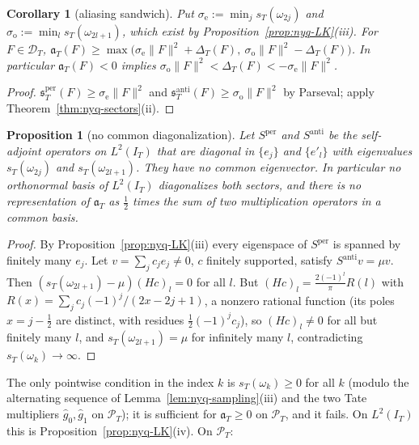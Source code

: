 \documentclass[11pt]{amsart}
\newtheorem{proposition}[theorem]{Proposition}
\newtheorem{corollary}[theorem]{Corollary}
\theoremstyle{definition}
\theoremstyle{remark}
\newcommand{\PT}{\mathcal P_T}
\newcommand{\IT}{I_T}
\newcommand{\gh}[1]{\widehat g_{#1}}
\begin{document}
\begin{corollary}[aliasing sandwich]\label{cor:nyq-sandwich}
Put $\sigma_{\mathrm e}:=\min_js_T(\omega_{2j})$ and $\sigma_{\mathrm o}:=\min_ls_T(\omega_{2l+1})$, which exist by
Proposition~\ref{prop:nyq-LK}(iii). For $F\in\mathcal D_T$,
$\mathfrak a_T(F)\ge\max\big(\sigma_{\mathrm e}\|F\|^2+\Delta_T(F),\ \sigma_{\mathrm o}\|F\|^2-\Delta_T(F)\big)$. In particular
$\mathfrak a_T(F)<0$ implies $\sigma_{\mathrm o}\|F\|^2<\Delta_T(F)<-\sigma_{\mathrm e}\|F\|^2$.
\end{corollary}

\begin{proof}
$\mathfrak s^{\mathrm{per}}_T(F)\ge\sigma_{\mathrm e}\|F\|^2$ and $\mathfrak s^{\mathrm{anti}}_T(F)\ge\sigma_{\mathrm o}\|F\|^2$ by Parseval;
apply Theorem~\ref{thm:nyq-sectors}(ii).
\end{proof}

\begin{proposition}[no common diagonalization]\label{prop:nyq-nopoint}
Let $S^{\mathrm{per}}$ and $S^{\mathrm{anti}}$ be the self-adjoint operators on $L^2(\IT)$ that are diagonal in
$\{e_j\}$ and $\{e'_l\}$ with eigenvalues $s_T(\omega_{2j})$ and $s_T(\omega_{2l+1})$. They have no common
eigenvector. In particular no orthonormal basis of $L^2(\IT)$ diagonalizes both sectors, and there is no
representation of $\mathfrak a_T$ as $\frac12$ times the sum of two multiplication operators in a common basis.
\end{proposition}

\begin{proof}
By Proposition~\ref{prop:nyq-LK}(iii) every eigenspace of $S^{\mathrm{per}}$ is spanned by finitely many $e_j$. Let
$v=\sum_jc_je_j\ne0$, $c$ finitely supported, satisfy $S^{\mathrm{anti}}v=\mu v$. Then
$(s_T(\omega_{2l+1})-\mu)(Hc)_l=0$ for all $l$. But $(Hc)_l=\frac{2(-1)^l}\pi R(l)$ with
$R(x)=\sum_jc_j(-1)^j/(2x-2j+1)$, a nonzero rational function (its poles $x=j-\frac12$ are distinct, with residues
$\frac12(-1)^jc_j$), so $(Hc)_l\ne0$ for all but finitely many $l$, and $s_T(\omega_{2l+1})=\mu$ for infinitely many
$l$, contradicting $s_T(\omega_k)\to\infty$.
\end{proof}

The only pointwise condition in the index $k$ is $s_T(\omega_k)\ge0$ for all $k$ (modulo the alternating sequence of
Lemma~\ref{lem:nyq-sampling}(iii) and the two Tate multipliers $\gh0,\gh1$ on $\PT$); it is sufficient for
$\mathfrak a_T\ge0$ on $\PT$, and it fails. On $L^2(\IT)$ this is Proposition~\ref{prop:nyq-LK}(iv). On $\PT$:
\end{document}
